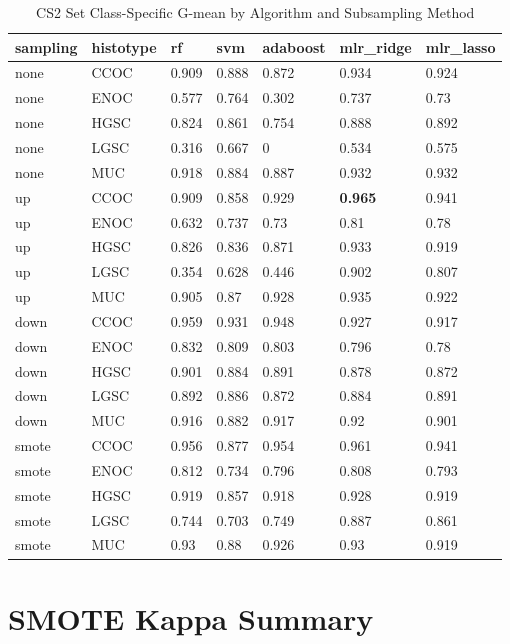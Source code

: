 \documentclass[
]{report}
\begin{document}
\begin{table}

\caption{\label{tab:cs2-gmean-class-table}CS2 Set Class-Specific G-mean by Algorithm and Subsampling Method}
\centering
\begin{tabular}[t]{l|l|l|l|l|l|l}
\hline
sampling & histotype & rf & svm & adaboost & mlr\_ridge & mlr\_lasso\\
\hline
none & CCOC & 0.909 & 0.888 & 0.872 & 0.934 & 0.924\\
\hline
none & ENOC & 0.577 & 0.764 & 0.302 & 0.737 & 0.73\\
\hline
none & HGSC & 0.824 & 0.861 & 0.754 & 0.888 & 0.892\\
\hline
none & LGSC & 0.316 & 0.667 & 0 & 0.534 & 0.575\\
\hline
none & MUC & 0.918 & 0.884 & 0.887 & 0.932 & 0.932\\
\hline
up & CCOC & 0.909 & 0.858 & 0.929 & \textbf{0.965} & 0.941\\
\hline
up & ENOC & 0.632 & 0.737 & 0.73 & 0.81 & 0.78\\
\hline
up & HGSC & 0.826 & 0.836 & 0.871 & 0.933 & 0.919\\
\hline
up & LGSC & 0.354 & 0.628 & 0.446 & 0.902 & 0.807\\
\hline
up & MUC & 0.905 & 0.87 & 0.928 & 0.935 & 0.922\\
\hline
down & CCOC & 0.959 & 0.931 & 0.948 & 0.927 & 0.917\\
\hline
down & ENOC & 0.832 & 0.809 & 0.803 & 0.796 & 0.78\\
\hline
down & HGSC & 0.901 & 0.884 & 0.891 & 0.878 & 0.872\\
\hline
down & LGSC & 0.892 & 0.886 & 0.872 & 0.884 & 0.891\\
\hline
down & MUC & 0.916 & 0.882 & 0.917 & 0.92 & 0.901\\
\hline
smote & CCOC & 0.956 & 0.877 & 0.954 & 0.961 & 0.941\\
\hline
smote & ENOC & 0.812 & 0.734 & 0.796 & 0.808 & 0.793\\
\hline
smote & HGSC & 0.919 & 0.857 & 0.918 & 0.928 & 0.919\\
\hline
smote & LGSC & 0.744 & 0.703 & 0.749 & 0.887 & 0.861\\
\hline
smote & MUC & 0.93 & 0.88 & 0.926 & 0.93 & 0.919\\
\hline
\end{tabular}
\end{table}

\hypertarget{smote-kappa-summary}{%
\section{SMOTE Kappa Summary}\label{smote-kappa-summary}}
\end{document}

